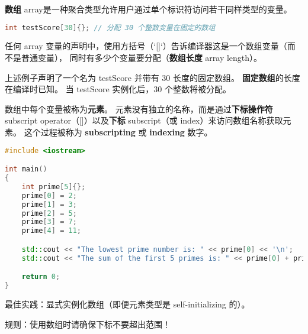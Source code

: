 \documentclass[../../LearnCpp.tex]{subfiles}
\begin{document}

\textbf{数组} array是一种聚合类型允许用户通过单个标识符访问若干同样类型的变量。

\begin{lstlisting}[language=C++]
int testScore[30]{}; // 分配 30 个整数变量在固定的数组
\end{lstlisting}

任何 array 变量的声明中，使用方括号（`[]`）告诉编译器这是一个数组变量（而不是普通变量），
同时有多少个变量要分配（\textbf{数组长度} array length）。

上述例子声明了一个名为 testScore 并带有 30 长度的固定数组。
\textbf{固定数组}的长度在编译时已知。
当 testScore 实例化后，30 个整数将被分配。

数组中每个变量被称为\textbf{元素}。
元素没有独立的名称，而是通过\textbf{下标操作符} subscript operator（[]）以及\textbf{下标} subscript（或 index）来访问数组名称获取元素。
这个过程被称为 \textbf{subscripting} 或 \textbf{indexing} 数字。

\begin{lstlisting}[language=C++]
#include <iostream>

int main()
{
    int prime[5]{};
    prime[0] = 2;
    prime[1] = 3;
    prime[2] = 5;
    prime[3] = 7;
    prime[4] = 11;

    std::cout << "The lowest prime number is: " << prime[0] << '\n';
    std::cout << "The sum of the first 5 primes is: " << prime[0] + prime[1] + prime[2] + prime[3] + prime[4] << '\n';

    return 0;
}
\end{lstlisting}

最佳实践：显式实例化数组（即便元素类型是 self-initializing 的）。

规则：使用数组时请确保下标不要超出范围！
\end{document}
